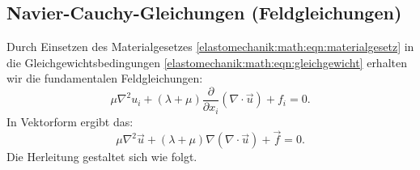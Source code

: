 \subsection{Navier-Cauchy-Gleichungen (Feldgleichungen)}
Durch Einsetzen des Materialgesetzes
\eqref{elastomechanik:math:eqn:materialgesetz}
in die Gleichgewichtsbedingungen
\eqref{elastomechanik:math:eqn:gleichgewicht}
erhalten wir die fundamentalen Feldgleichungen:
\begin{equation*}
	\mu \nabla^2 u_i + (\lambda + \mu) \frac{\partial}{\partial x_i} (\nabla \cdot \vec{u}) + f_i =
	0.
\end{equation*}
In Vektorform ergibt das:
\begin{equation*}
	\mu \nabla^2 \vec{u} + (\lambda + \mu) \nabla (\nabla \cdot \vec{u}) + \vec{f} = 
	0.
\end{equation*}
Die Herleitung gestaltet sich wie folgt.

